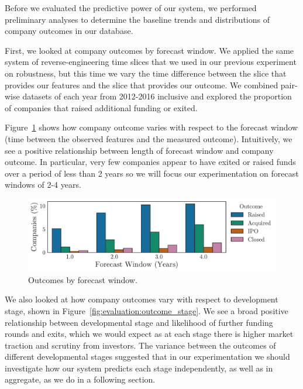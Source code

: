 \documentclass[../thesis/thesis.tex]{subfiles}
\begin{document}
Before we evaluated the predictive power of our system, we performed preliminary analyses to determine the baseline trends and distributions of company outcomes in our database.

First, we looked at company outcomes by forecast window. We applied the same system of reverse-engineering time slices that we used in our previous experiment on robustness, but this time we vary the time difference between the slice that provides our features and the slice that provides our outcome. We combined pair-wise datasets of each year from 2012-2016 inclusive and explored the proportion of companies that raised additional funding or exited.

Figure~\ref{fig:evaluation:outcome_forecast_window} shows how company outcome varies with respect to the forecast window (time between the observed features and the measured outcome). Intuitively, we see a positive relationship between length of forecast window and company outcome. In particular, very few companies appear to have exited or raised funds over a period of less than 2 years so we will focus our experimentation on forecast windows of 2-4 years.

\begin{figure}[!htb]
    \centering
    \includegraphics[width=\textwidth]{../figures/evaluation/outcomes_window}
    \caption[Outcomes by forecast window]{Outcomes by forecast window.}
    \label{fig:evaluation:outcome_forecast_window}
\end{figure}

We also looked at how company outcomes vary with respect to development stage, shown in Figure~\ref{fig:evaluation:outcome_stage}. We see a broad positive relationship between developmental stage and likelihood of further funding rounds and exits, which we would expect as at each stage there is higher market traction and scrutiny from investors. The variance between the outcomes of different developmental stages suggested that in our experimentation we should investigate how our system predicts each stage independently, as well as in aggregate, as we do in a following section.
\end{document}
